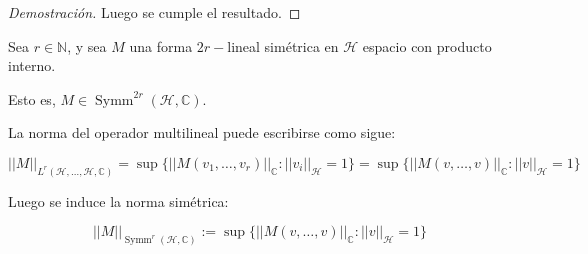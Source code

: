 \begin{proof}[Demostración]
	Luego se cumple el resultado.
\end{proof}

\begin{thm}[Norma de F.M.S.]
	
	Sea $r \in \mathbb{N    }$, y sea $M$ una forma $2r-$lineal simétrica en $\mathcal{H}$ espacio con producto interno.
	
	Esto es, $M\in \operatorname{Symm}^{2r}(\mathcal{H}, \mathbb{C})$.
	
	La norma del operador multilineal puede escribirse como sigue:
	
	\begin{equation*}
		||M||_{L^r(\mathcal{H},\dots,\mathcal{H}, \mathbb{C})} = \sup \{||M(v_1,\dots,v_r)||_\mathbb{C} : ||v_i||_{\mathcal{H}} = 1 \} = \sup \{||M(v,\dots,v)||_\mathbb{C}: ||v||_{\mathcal{H}} = 1 \}    
	\end{equation*}
	
	
	Luego se induce la norma simétrica:
	
	\begin{equation*}
		||M||_{\operatorname{Symm}^r(\mathcal{H}, \mathbb{C})} :=  \sup \{||M(v,\dots,v)||_\mathbb{C} : ||v||_{\mathcal{H}} = 1 \}
	\end{equation*}
\end{thm}

